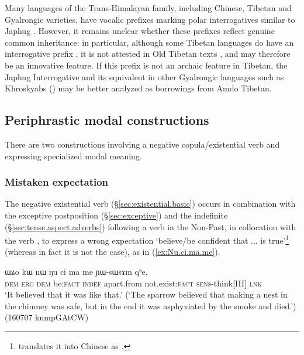 Many languages of the Trans-Himalayan family, including Chinese, Tibetan and Gyalrongic varieties, have vocalic prefixes marking polar interrogatives similar to Japhug  \citep{sunhk96yiwen}. However, it remains unclear whether these prefixes reflect genuine common inheritance: in particular, although some Tibetan languages do have an interrogative prefix , it is not attested in Old Tibetan texts \citep{hoshi12e}, and may therefore be an innovative feature. If this prefix is not an archaic feature in Tibetan,  the Japhug Interrogative  and its equivalent in other Gyalrongic languages such as Khroskyabs  (\citealt[340]{lai17khroskyabs}) may be better analyzed as borrowings from Amdo Tibetan.


\subsection{Periphrastic modal constructions} \label{sec:cimame.cinAmaRkW}
There are two constructions involving a negative copula/existential verb and expressing specialized modal meaning.

\subsubsection{Mistaken expectation} \label{sec:cimame}
The negative existential verb   (§\ref{sec:existential.basic}) occurs in combination with the exceptive postposition  (§\ref{sec:exceptive}) and the indefinite  (§\ref{sec:tense.aspect.adverbs}) following a verb in the Non-Past, in collocation with the verb , to express a wrong expectation `believe/be confident that ... is true'\footnote{ translates it into Chinese as . } (whereas in fact it is not the case), as in (\ref{ex:Nu.ci.ma.me}). 


\begin{exe}
	\ex \label{ex:Nu.ci.ma.me}
	\gll ɯʑo kɯ nɯ ŋu ci ma me ɲɯ-sɯsɤm qʰe,  \\
	\textsc{dem} \textsc{erg} \textsc{dem} be:\textsc{fact} \textsc{indef} apart.from  not.exist:\textsc{fact} \textsc{sens}-think[III] \textsc{lnk} \\
	\glt `It believed that it was like that.'  (`The sparrow believed that making a nest in the chimney was safe, but in the end it was asphyxiated by the smoke and died.') (160707 kumpGAtCW)
\end{exe}

